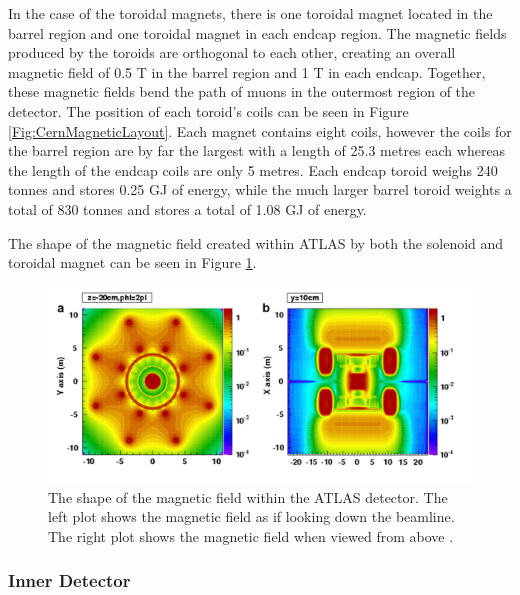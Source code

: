 \documentclass[12pt,a4paper,epsf,portrait,times,epsfig]{article}
\begin{document}
		In the case of the toroidal magnets, there is one toroidal magnet located in the barrel region and one toroidal magnet in each endcap region. The magnetic fields produced by the toroids are orthogonal to each other, creating an overall magnetic field of 0.5 T in the barrel region and 1 T in each endcap. Together, these magnetic fields bend the path of muons in the outermost region of the detector. The position of each toroid's coils can be seen in Figure \ref{Fig:CernMagneticLayout}. Each magnet contains eight coils, however the coils for the barrel region are by far the largest with a length of 25.3 metres each whereas the length of the endcap coils are only 5 metres. Each endcap toroid weighs 240 tonnes and stores 0.25 GJ of energy, while the much larger barrel toroid weights a total of 830 tonnes and stores a total of 1.08 GJ of energy. 
		
		The shape of the magnetic field created within ATLAS by both the solenoid and toroidal magnet can be seen in Figure \ref{Fig:CernMagneticField}. 
		
		\begin{figure}
			\centering
			\includegraphics[scale=0.4]{Magnetic_Field}
			\caption{The shape of the magnetic field within the ATLAS detector. The left plot shows the magnetic field as if looking down the beamline. The right plot shows the magnetic field when viewed from above \cite{Article:CernMagnets}. }
			\label{Fig:CernMagneticField}
		\end{figure}

		\subsubsection{Inner Detector}\label{Section:InnerDetector}
\end{document}
